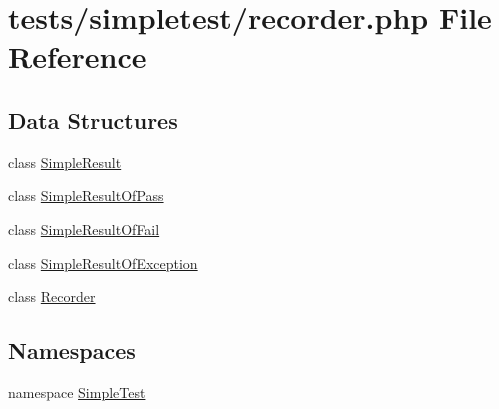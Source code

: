 \hypertarget{recorder_8php}{\section{tests/simpletest/recorder.php File Reference}
\label{recorder_8php}
}
\subsection*{Data Structures}
\begin{DoxyCompactItemize}
\item 
class \hyperlink{class_simple_result}{Simple\-Result}
\item 
class \hyperlink{class_simple_result_of_pass}{Simple\-Result\-Of\-Pass}
\item 
class \hyperlink{class_simple_result_of_fail}{Simple\-Result\-Of\-Fail}
\item 
class \hyperlink{class_simple_result_of_exception}{Simple\-Result\-Of\-Exception}
\item 
class \hyperlink{class_recorder}{Recorder}
\end{DoxyCompactItemize}
\subsection*{Namespaces}
\begin{DoxyCompactItemize}
\item 
namespace \hyperlink{namespace_simple_test}{Simple\-Test}
\end{DoxyCompactItemize}
